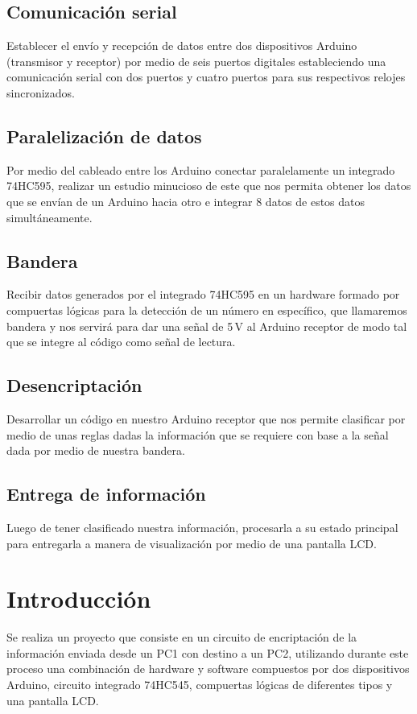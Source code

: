 \documentclass{article}
\begin{document}
\subsection{Comunicación serial}
Establecer el envío y recepción de datos entre dos dispositivos Arduino (transmisor y receptor) por medio de seis puertos digitales estableciendo una comunicación serial con dos puertos y cuatro puertos para sus respectivos relojes sincronizados.

\subsection{Paralelización de datos}
Por medio del cableado entre los Arduino conectar paralelamente un integrado 74HC595, realizar un estudio minucioso de este que nos permita obtener los datos que se envían de un Arduino hacia otro e integrar 8 datos de estos datos simultáneamente.

\subsection{Bandera}
Recibir datos generados por el integrado 74HC595 en un hardware formado por compuertas lógicas para la detección de un número en específico, que llamaremos bandera y nos servirá para dar una señal de 5 V al Arduino receptor de modo tal que se integre al código como señal de lectura.

\subsection{Desencriptación}
Desarrollar un código en nuestro Arduino receptor que nos permite clasificar por medio de unas reglas dadas la información que se requiere con base a la señal dada por medio de nuestra bandera.

\subsection{Entrega de información}
Luego de tener clasificado nuestra información, procesarla a su estado principal para entregarla a manera de visualización por medio de una pantalla LCD.

\newpage


\section{Introducción}
Se realiza un proyecto que consiste en un circuito de encriptación de la información enviada desde un PC1 con destino a un PC2, utilizando durante este proceso una combinación de hardware y software compuestos por dos dispositivos Arduino, circuito integrado 74HC545, compuertas lógicas de diferentes tipos y una pantalla LCD.\newline
\end{document}
